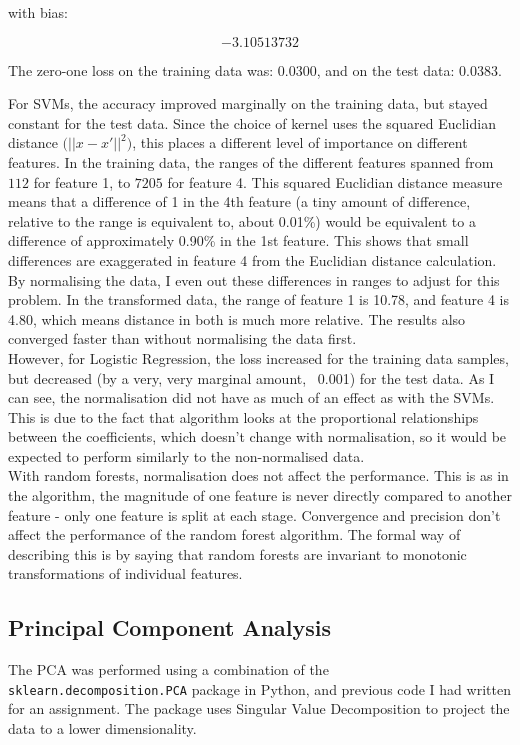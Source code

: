 \documentclass{scrartcl}
\begin{document}
with bias:

\[ -3.10513732 \]

The zero-one loss on the training data was: $0.0300$, and on the test data: $0.0383$.

For SVMs, the accuracy improved marginally on the training data, but stayed constant for the test data. Since the choice of kernel uses the squared Euclidian distance $\big( || x - x' || ^2 \big)$, this places a different level of importance on different features. In the training data, the ranges of the different features spanned from $112$ for feature 1, to $7205$ for feature 4. This squared Euclidian distance measure means that a difference of 1 in the 4th feature (a tiny amount of difference, relative to the range is equivalent to, about 0.01\%) would be equivalent to a difference of approximately 0.90\% in the 1st feature. This shows that small differences are exaggerated in feature 4 from the Euclidian distance calculation. By normalising the data, I even out these differences in ranges to adjust for this problem. In the transformed data, the range of feature 1 is 10.78, and feature 4 is 4.80, which means distance in both is much more relative. The results also converged faster than without normalising the data first. \\

However, for Logistic Regression, the loss increased for the training data samples, but decreased (by a very, very marginal amount, ~0.001) for the test data. As I can see, the normalisation did not have as much of an effect as with the SVMs. This is due to the fact that algorithm looks at the proportional relationships between the coefficients, which doesn't change with normalisation, so it would be expected to perform similarly to the non-normalised data. \\

With random forests, normalisation does not affect the performance. This is as in the algorithm, the magnitude of one feature is never directly compared to another feature - only one feature is split at each stage. Convergence and precision don't affect the performance of the random forest algorithm. The formal way of describing this is by saying that random forests are invariant to monotonic transformations of individual features.\cite{so:norm}

\subsection{Principal Component Analysis}
The PCA was performed using a combination of the \texttt{sklearn.decomposition.PCA} package in Python, and previous code I had written for an assignment. The package uses Singular Value Decomposition to project the data to a lower dimensionality. \\
\end{document}
